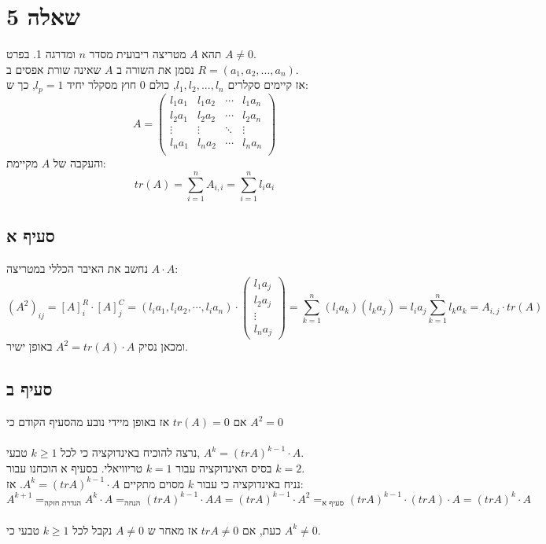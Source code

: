 \documentclass{article}
\DeclareMathOperator*{\equals}{=}
\begin{document}
\pagebreak

\section*{שאלה 5}

תהא $A$ מטריצה ריבועית מסדר $n$ ומדרגה 1. בפרט $A\ne 0$. \\
נסמן את השורה ב $A$ שאינה שורת אפסים ב $R=(a_1, a_2, ..., a_n)$. \\
אז קיימים סקלרים $l_1, l_2, ..., l_n$, כולם 0 חוץ מסקלר יחיד $l_p=1$, כך ש:
\[
    A=\begin{pmatrix}
        l_1a_1 & l_1a_2 & \cdots & l_1a_n \\
        l_2a_1 & l_2a_2 & \cdots & l_2a_n \\
        \vdots & \vdots & \ddots & \vdots \\
        l_na_1 & l_na_2 & \cdots & l_na_n \\
    \end{pmatrix}
\]
והעקבה של $A$ מקיימת:
\[
    tr(A)=
    \sum_{i=1}^n A_{i, i}=
    \sum_{i=1}^n l_ia_i
\]

\subsection*{סעיף א}

נחשב את האיבר הכללי במטריצה $A\cdot A$:
\[
    (A^2)_{ij}=[A]^R_i\cdot [A]^C_j=(l_ia_1, l_ia_2, \cdots, l_ia_n) \cdot \begin{pmatrix}
        l_1a_j \\
        l_2a_j \\
        \vdots \\
        l_na_j
    \end{pmatrix}=
    \sum_{k=1}^n (l_ia_k)(l_k a_j)=
    l_i a_j \sum_{k=1}^n l_ka_k =
    A_{i,j} \cdot tr(A)
\]
ומכאן נסיק $A^2=tr(A) \cdot A$ באופן ישיר.

\subsection*{סעיף ב}
אם $tr(A)=0$ אז באופן מיידי נובע מהסעיף הקודם כי $A^2=0$\\\\
נרצה להוכיח באינדוקציה כי לכל $k\geq 1$ טבעי, $A^k=(tr A)^{k-1}\cdot A$. \\
בסיס האינדוקציה עבור $k=1$ טריוויאלי. בסעיף א הוכחנו עבור $k=2$.\\
נניח באינדוקציה כי עבור $k$ מסוים מתקיים $A^k=(tr A)^{k-1}\cdot A$. אז:
\[
    A^{k+1}\equals_{\text{הגדרת חזקה}}
    A^k \cdot A \equals_{\text{הנחה}}
    (tr A)^{k-1} \cdot AA =
    (tr A)^{k-1} \cdot A^2 \equals_{\text{סעיף א}}
    (tr A)^{k-1} \cdot (tr A) \cdot A =
    (tr A)^k \cdot A
\]
\\
כעת, אם $tr A \ne 0$ אז מאחר ש $A\ne 0$ נקבל לכל $k\geq 1$ טבעי כי $A^k\ne 0$.
\end{document}

